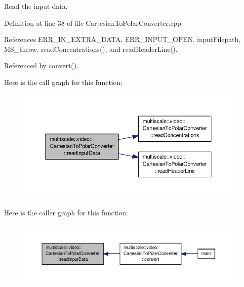Read the input data. 



Definition at line 38 of file Cartesian\-To\-Polar\-Converter.\-cpp.



References E\-R\-R\-\_\-\-I\-N\-\_\-\-E\-X\-T\-R\-A\-\_\-\-D\-A\-T\-A, E\-R\-R\-\_\-\-I\-N\-P\-U\-T\-\_\-\-O\-P\-E\-N, input\-Filepath, M\-S\-\_\-throw, read\-Concentrations(), and read\-Header\-Line().



Referenced by convert().



Here is the call graph for this function\-:\nopagebreak
\begin{figure}[H]
\begin{center}
\leavevmode
\includegraphics[width=350pt]{classmultiscale_1_1video_1_1CartesianToPolarConverter_a37891007ade23e05047d33d0c9cb3e13_cgraph}
\end{center}
\end{figure}




Here is the caller graph for this function\-:\nopagebreak
\begin{figure}[H]
\begin{center}
\leavevmode
\includegraphics[width=350pt]{classmultiscale_1_1video_1_1CartesianToPolarConverter_a37891007ade23e05047d33d0c9cb3e13_icgraph}
\end{center}
\end{figure}


